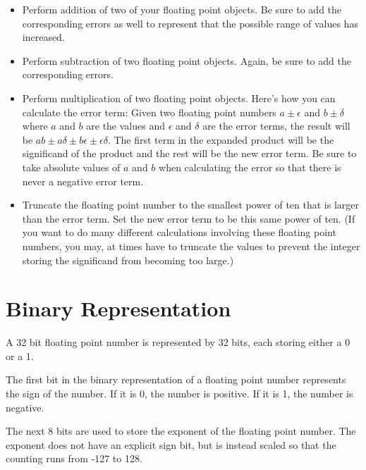 \begin{problem}
\begin{itemize}
\begin{itemize}
	\item Perform addition of two of your floating point objects.
		Be sure to add the corresponding errors as well to represent that the possible range of values has increased.

	\item Perform subtraction of two floating point objects.
		Again, be sure to add the corresponding errors.

	\item Perform multiplication of two floating point objects.
		Here's how you can calculate the error term:
		Given two floating point numbers $a\pm\epsilon$ and $b\pm\delta$ where $a$ and $b$ are the values and $\epsilon$ and $\delta$ are the error terms, the result will be $ab \pm a\delta \pm b\epsilon \pm \epsilon\delta$.
		The first term in the expanded product will be the significand of the product and the rest will be the new error term.
		Be sure to take absolute values of $a$ and $b$ when calculating the error so that there is never a negative error term.

	\item Truncate the floating point number to the smallest power of ten that is larger than the error term.
		Set the new error term to be this same power of ten.
		(If you want to do many different calculations involving these floating point numbers, you may, at times have to truncate the values to prevent the integer storing the significand from becoming too large.)

	\end{itemize}

\end{itemize}
\end{problem}

\section*{Binary Representation}

A 32 bit floating point number is represented by 32 bits, each storing either a 0 or a 1.

The first bit in the binary representation of a floating point number represents the sign of the number.
If it is 0, the number is positive.
If it is 1, the number is negative.

The next 8 bits are used to store the exponent of the floating point number.
The exponent does not have an explicit sign bit, but is instead scaled so that the counting runs from -127 to 128.

